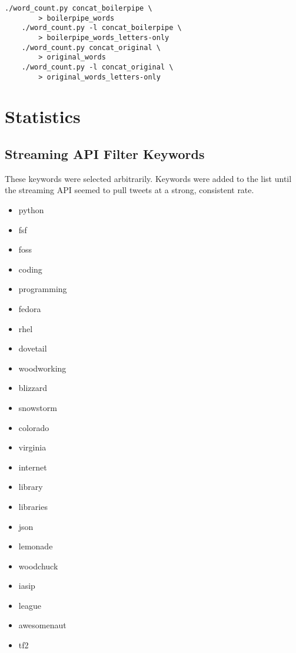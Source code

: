 \documentclass[a4paper,12pt]{article}
\begin{document}
\begin{lstlisting}[basicstyle=\ttfamily,caption={Concatenating input and output data.}]
    ./word_count.py concat_boilerpipe \
        > boilerpipe_words
    ./word_count.py -l concat_boilerpipe \
        > boilerpipe_words_letters-only
    ./word_count.py concat_original \
        > original_words
    ./word_count.py -l concat_original \
        > original_words_letters-only
\end{lstlisting}

\section{Statistics}


\clearpage
\begin{appendices}

\section{Streaming API Filter Keywords}
These keywords were selected arbitrarily. Keywords were added to the list until the streaming
API seemed to pull tweets at a strong, consistent rate.
\begin{multicols}{3}
\begin{itemize}
    \item python
    \item fsf
    \item foss
    \item coding
    \item programming
    \item fedora
    \item rhel
    \item dovetail
    \item woodworking
    \item blizzard
    \item snowstorm
    \item colorado
    \item virginia
    \item internet
    \item library
    \item libraries
    \item json
    \item lemonade
    \item woodchuck
    \item iasip
    \item league
    \item awesomenaut
    \item tf2
\end{itemize}
\end{multicols}

\end{appendices}






\end{document}
